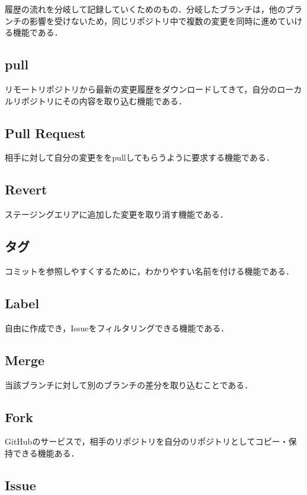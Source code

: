 履歴の流れを分岐して記録していくためのもの．分岐したブランチは，他のブランチの影響を受けないため，同じリポジトリ中で複数の変更を同時に進めていける機能である．


\subsection{pull}

リモートリポジトリから最新の変更履歴をダウンロードしてきて，自分のローカルリポジトリにその内容を取り込む機能である．


\subsection{Pull Request}

相手に対して自分の変更ををpullしてもらうように要求する機能である．


\subsection{Revert}

ステージングエリアに追加した変更を取り消す機能である．

\subsection{タグ}

コミットを参照しやすくするために，わかりやすい名前を付ける機能である．


\subsection{Label}

自由に作成でき，Issueをフィルタリングできる機能である．


\subsection{Merge}

当該ブランチに対して別のブランチの差分を取り込むことである．


\subsection{Fork}

GitHubのサービスで，相手のリポジトリを自分のリポジトリとしてコピー・保持できる機能ある．


\subsection{Issue}

